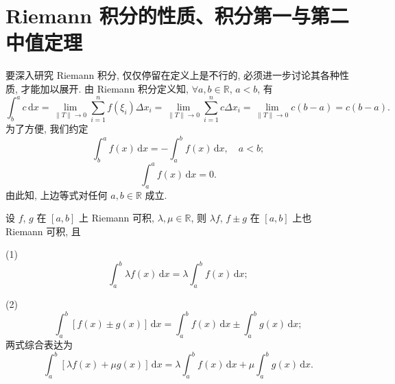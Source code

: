 \section{Riemann 积分的性质、积分第一与第二中值定理}\label{sec:6.2}

要深入研究 Riemann 积分, 仅仅停留在定义上是不行的, 必须进一步讨论其各种性质, 才能加以展开. 由 Riemann 积分定义知, $\forall a,b\in\mathbb{R}$, $a<b$, 有
\[
\int_{b}^{a}c\,\mathrm{d}x=\lim_{\|T\|\to 0}\sum_{i=1}^{n}f(\xi_{i})\Delta x_{i}=\lim_{\|T\|\to 0}\sum_{i=1}^{n}c\Delta x_{i}=\lim_{\|T\|\to 0}c(b-a)=c(b-a).
\]
为了方便, 我们约定
\[
\int_{b}^{a}f(x)\,\mathrm{d}x=-\int_{a}^{b}f(x)\,\mathrm{d}x,\quad a<b;
\]
\[
\int_{a}^{a}f(x)\,\mathrm{d}x=0.
\]
由此知, 上边等式对任何 $a,b\in\mathbb{R}$ 成立.

\begin{theorem}\label{thm:6.2.1}
设 $f$, $g$ 在 $[a,b]$ 上 Riemann 可积, $\lambda,\mu\in\mathbb{R}$, 则 $\lambda f$, $f\pm g$ 在 $[a,b]$ 上也 Riemann 可积, 且

(1)
\[
\int_{a}^{b}\lambda f(x)\,\mathrm{d}x=\lambda\int_{a}^{b}f(x)\,\mathrm{d}x;
\]

(2)
\[
\int_{a}^{b}[f(x)\pm g(x)]\,\mathrm{d}x=\int_{a}^{b}f(x)\,\mathrm{d}x\pm\int_{a}^{b}g(x)\,\mathrm{d}x;
\]
两式综合表达为
\[
\int_{a}^{b}[\lambda f(x)+\mu g(x)]\,\mathrm{d}x=\lambda\int_{a}^{b}f(x)\,\mathrm{d}x+\mu\int_{a}^{b}g(x)\,\mathrm{d}x.
\]
\end{theorem}

